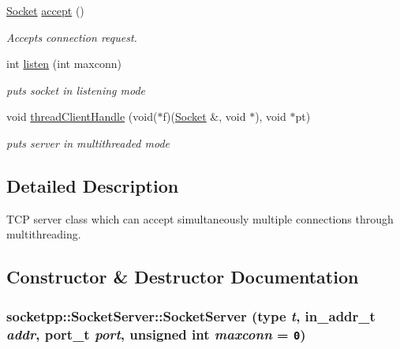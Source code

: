 \begin{CompactItemize}
\hyperlink{classsocketpp_1_1Socket}{Socket} \hyperlink{classsocketpp_1_1SocketServer_55909eb55066700b93cb8607bfb1df5b}{accept} ()
\begin{CompactList}\small\item\em Accepts connection request. \item\end{CompactList}\item 
int \hyperlink{classsocketpp_1_1SocketServer_034ddc2def5342b5a26264ffcb9e8e36}{listen} (int maxconn)
\begin{CompactList}\small\item\em puts socket in listening mode \item\end{CompactList}\item 
void \hyperlink{classsocketpp_1_1SocketServer_0ded92a6348a6cf953d9f646fac43ac2}{threadClientHandle} (void($\ast$f)(\hyperlink{classsocketpp_1_1Socket}{Socket} \&, void $\ast$), void $\ast$pt)
\begin{CompactList}\small\item\em puts server in multithreaded mode \item\end{CompactList}\end{CompactItemize}


\subsection{Detailed Description}
TCP server class which can accept simultaneously multiple connections through multithreading. 

\subsection{Constructor \& Destructor Documentation}
\hypertarget{classsocketpp_1_1SocketServer_73c5125f9e5a6cf03dc15f6d4250e345}{
\subsubsection[{SocketServer}]{\setlength{\rightskip}{0pt plus 5cm}socketpp::SocketServer::SocketServer (type {\em t}, \/  in\_\-addr\_\-t {\em addr}, \/  port\_\-t {\em port}, \/  unsigned int {\em maxconn} = {\tt 0})}}
\label{classsocketpp_1_1SocketServer_73c5125f9e5a6cf03dc15f6d4250e345}


